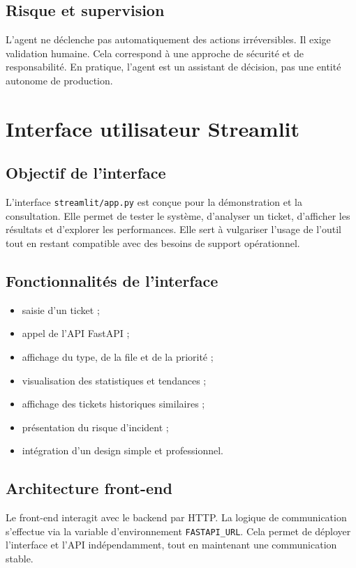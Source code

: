 \documentclass[11pt,a4paper]{report}
\begin{document}
\section{Risque et supervision}
L’agent ne déclenche pas automatiquement des actions irréversibles. Il exige validation humaine. Cela correspond à une approche de sécurité et de responsabilité. En pratique, l’agent est un assistant de décision, pas une entité autonome de production.

\chapter{Interface utilisateur Streamlit}
\section{Objectif de l’interface}
L’interface \texttt{streamlit/app.py} est conçue pour la démonstration et la consultation. Elle permet de tester le système, d’analyser un ticket, d’afficher les résultats et d’explorer les performances. Elle sert à vulgariser l’usage de l’outil tout en restant compatible avec des besoins de support opérationnel.

\section{Fonctionnalités de l’interface}
\begin{itemize}[leftmargin=1.3em]
    \item saisie d’un ticket ;
    \item appel de l’API FastAPI ;
    \item affichage du type, de la file et de la priorité ;
    \item visualisation des statistiques et tendances ;
    \item affichage des tickets historiques similaires ;
    \item présentation du risque d’incident ;
    \item intégration d’un design simple et professionnel.
\end{itemize}

\section{Architecture front-end}
Le front-end interagit avec le backend par HTTP. La logique de communication s’effectue via la variable d’environnement \texttt{FASTAPI\_URL}. Cela permet de déployer l’interface et l’API indépendamment, tout en maintenant une communication stable.
\end{document}
